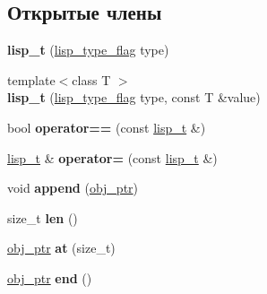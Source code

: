 \subsection*{Открытые члены}
\begin{DoxyCompactItemize}
\item 
\mbox{\label{structlisp__t_a8440291143a1d2e77211729d991f5488}} 
{\bfseries lisp\+\_\+t} (\mbox{\hyperlink{lisp__type__flag_8hpp_a055b7e4c72b7a614806ae1225539b99f}{lisp\+\_\+type\+\_\+flag}} type)
\item 
\mbox{\label{structlisp__t_a905f36e0f3f94843189a0dcb863b751e}} 
{\footnotesize template$<$class T $>$ }\\{\bfseries lisp\+\_\+t} (\mbox{\hyperlink{lisp__type__flag_8hpp_a055b7e4c72b7a614806ae1225539b99f}{lisp\+\_\+type\+\_\+flag}} type, const T \&value)
\item 
\mbox{\label{structlisp__t_aa591bc4bd65be7cd9377f3a33abb9259}} 
bool {\bfseries operator==} (const \mbox{\hyperlink{structlisp__t}{lisp\+\_\+t}} \&)
\item 
\mbox{\label{structlisp__t_a3148073588fe6aa2bb6a0704e4ed1f21}} 
\mbox{\hyperlink{structlisp__t}{lisp\+\_\+t}} \& {\bfseries operator=} (const \mbox{\hyperlink{structlisp__t}{lisp\+\_\+t}} \&)
\item 
\mbox{\label{structlisp__t_a4dcb779c9e6f4188182c10212d4d7bd5}} 
void {\bfseries append} (\mbox{\hyperlink{classmm__ptr}{obj\+\_\+ptr}})
\item 
\mbox{\label{structlisp__t_a23ae5189d44aa8845528a7d743e9c54f}} 
size\+\_\+t {\bfseries len} ()
\item 
\mbox{\label{structlisp__t_adf2f843efc9dacb5400650b885e24510}} 
\mbox{\hyperlink{classmm__ptr}{obj\+\_\+ptr}} {\bfseries at} (size\+\_\+t)
\item 
\mbox{\label{structlisp__t_ad4f1105bd90db1aab9e80e73a359758f}} 
\mbox{\hyperlink{classmm__ptr}{obj\+\_\+ptr}} {\bfseries end} ()
\item 
\mbox{\label{structlisp__t_a24e25c442fa9728a7a6f3fbbe0f0b7ac}} 

\end{DoxyCompactItemize}
